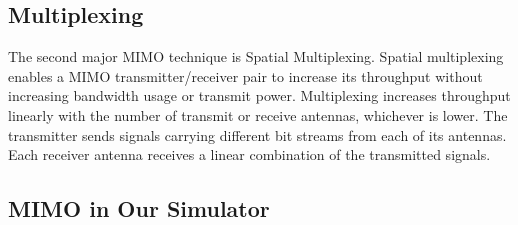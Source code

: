 \subsection{Multiplexing}
\label{subsection:MIMO-Multiplexing}
The second major MIMO technique is Spatial Multiplexing. Spatial multiplexing enables a MIMO transmitter/receiver pair to increase its throughput without increasing bandwidth usage or transmit power. Multiplexing increases throughput linearly with the number of transmit or receive antennas, whichever is lower. The transmitter sends signals carrying different bit streams from each of its antennas. Each receiver antenna receives a linear combination of the transmitted signals.

\subsection{MIMO in Our Simulator}